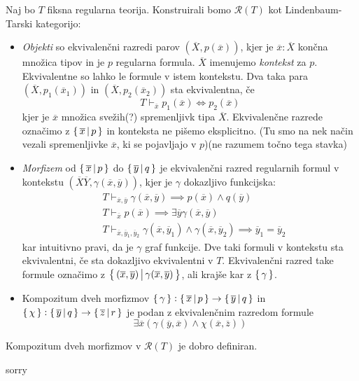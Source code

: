 \documentclass[../kategoricna_logika.tex]{subfiles}
\begin{document}
\begin{definicija}
  Naj bo $T$ fiksna regularna teorija. Konstruirali bomo $\mathcal{R}(T)$ kot Lindenbaum-Tarski kategorijo:
  \begin{itemize}
    \item \emph{Objekti} so ekvivalenčni razredi parov $(\overline{X}, p(\overline{x}))$,
      kjer je $\overline{x} : \overline{X}$ končna množica tipov in je $p$ regularna formula.
      $\overline{X}$ imenujemo \emph{kontekst} za $p$. Ekvivalentne so lahko le formule v istem kontekstu.
      Dva taka para $(\overline{X}, p_1(\overline{x}_1))$ in $(\overline{X}, p_2(\overline{x}_2))$ sta ekvivalentna, če
      $$T \vdash_{\overline{x}} p_1(\overline{x}) \Leftrightarrow p_2(\overline{x})$$
      kjer je $\overline{x}$ množica svežih(?) spremenljivk tipa $\overline{X}$.
      Ekvivalenčne razrede označimo z $\left\lbrace\,\overline{x} \,\middle|\, p\,\right\rbrace$ in konteksta ne pišemo eksplicitno.
      (Tu smo na nek način vezali spremenljivke $\overline{x}$, ki se pojavljajo v $p$)(ne razumem točno tega stavka)
    \item \emph{Morfizem} od $\left\lbrace\,\overline{x} \,\middle|\, p\,\right\rbrace$ do $\left\lbrace\,\overline{y} \,\middle|\, q\,\right\rbrace$
      je ekvivalenčni razred regularnih formul v kontekstu $(\overline{X}\overline{Y}, \gamma(\overline{x},\overline{y}))$,
      kjer je $\gamma$ dokazljivo funkcijska:
      \begin{align*}
        &T \vdash_{\overline{x},\overline{y}} \gamma(\overline{x},\overline{y})  \implies p(\overline{x}) \wedge q(\overline{y}) \\
        &T \vdash_{\overline{x}} p(\overline{x}) \implies \exists \overline{y} \gamma(\overline{x},\overline{y}) \\
        &T \vdash_{\overline{x},\overline{y}_1,\overline{y}_2} \gamma(\overline{x},\overline{y}_1) \wedge \gamma(\overline{x},\overline{y}_2) \implies \overline{y}_1 = \overline{y}_2
      \end{align*}
      kar intuitivno pravi, da je $\gamma$ graf funkcije. Dve taki formuli v kontekstu sta ekvivalentni, če sta dokazljivo ekvivalentni v $T$.
      Ekvivalenčni razred take formule označimo z $\left\lbrace\,(\overline{x},\overline{y}) \,\middle|\, \gamma(\overline{x},\overline{y})\,\right\rbrace$, ali krajše kar z $\left\lbrace\,\gamma\,\right\rbrace$.
    \item Kompozitum dveh morfizmov $\left\lbrace\,\gamma\,\right\rbrace : \left\lbrace\,\overline{x} \,\middle|\, p\,\right\rbrace \to \left\lbrace\,\overline{y} \,\middle|\, q\,\right\rbrace$ in
      $\left\lbrace\,\chi\,\right\rbrace : \left\lbrace\,\overline{y}\,\middle|\, q\,\right\rbrace \to \left\lbrace\,\overline{z}\,\middle|\, r\,\right\rbrace$ je podan z ekvivalenčnim razredom formule
      $$\exists \overline{x}(\gamma(\overline{y},\overline{x}) \wedge \chi(\overline{x},\overline{z}))$$
  \end{itemize}
\end{definicija}
\begin{lema}
  Kompozitum dveh morfizmov v $\mathcal{R}(T)$ je dobro definiran.
\end{lema}
\begin{dokaz}
  sorry
\end{dokaz}
\end{document}
